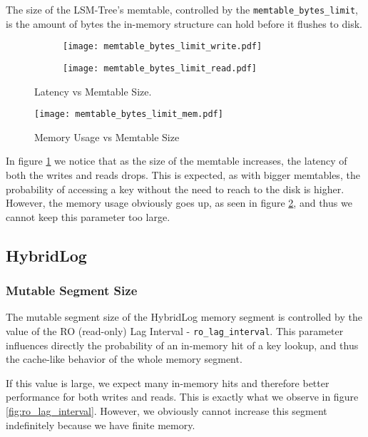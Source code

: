 The size of the LSM-Tree's memtable, controlled by the \verb"memtable_bytes_limit", is the amount of bytes the in-memory structure can hold before it flushes to disk.

\begin{figure}[h]
    \begin{subfigure}{.5\textwidth}
        \centering
        \texttt{[image: memtable\_bytes\_limit\_write.pdf]}
    \end{subfigure}
    \begin{subfigure}{.5\textwidth}
        \centering
        \texttt{[image: memtable\_bytes\_limit\_read.pdf]}
    \end{subfigure}
    \caption{Latency vs Memtable Size.}
    \label{fig:memtable-bytes-limit-write-read}
\end{figure}

\begin{figure}[h]
    \centering
    \texttt{[image: memtable\_bytes\_limit\_mem.pdf]}
    \caption{Memory Usage vs Memtable Size}
    \label{fig:memtable_bytes_limit_mem}
\end{figure}

In figure \ref{fig:memtable-bytes-limit-write-read} we notice that as the size of the memtable increases, the latency of both the writes and reads drops. This is expected, as with bigger memtables, the probability of accessing a key without the need to reach to the disk is higher. However, the memory usage obviously goes up, as seen in figure \ref{fig:memtable_bytes_limit_mem}, and thus we cannot keep this parameter too large.

\subsection{HybridLog}

\subsubsection{Mutable Segment Size}

The mutable segment size of the HybridLog memory segment is controlled by the value of the RO (read-only) Lag Interval - \verb"ro_lag_interval". This parameter influences directly the probability of an in-memory hit of a key lookup, and thus the cache-like behavior of the whole memory segment.

If this value is large, we expect many in-memory hits and therefore better performance for both writes and reads. This is exactly what we observe in figure \ref{fig:ro_lag_interval}. However, we obviously cannot increase this segment indefinitely because we have finite memory.

